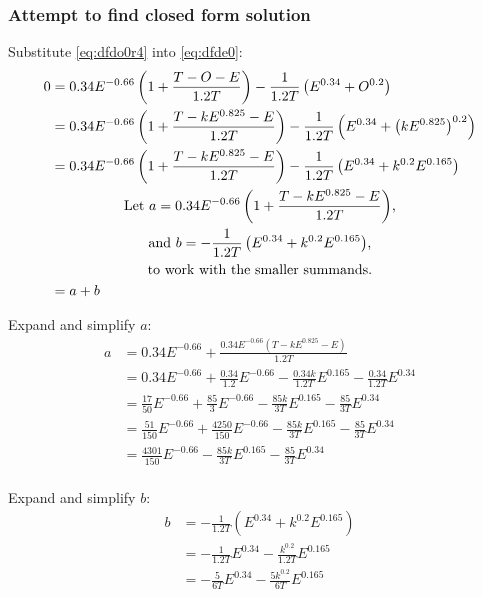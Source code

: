 \documentclass{article}
\begin{document}
\subsubsection{Attempt to find closed form solution}

Substitute \eqref{eq:dfdo0r4} into \eqref{eq:dfde0}:
\begin{equation}\label{eq:dfde0r}
  \begin{split}
    0 & = 0.34E^{-0.66}\left(1 + \frac{T - O - E}{1.2T}\right) - \frac{1}{1.2T}\left(E^{0.34} + O^{0.2}\right) \\
      & = 0.34E^{-0.66}\left(1 + \frac{T - kE^{0.825} - E}{1.2T}\right) - \frac{1}{1.2T}\left(E^{0.34} + \left(kE^{0.825}\right)^{0.2}\right) \\
      & = 0.34E^{-0.66}\left(1 + \frac{T - kE^{0.825} - E}{1.2T}\right) - \frac{1}{1.2T}\left(E^{0.34} + k^{0.2}E^{0.165}\right) \\
      \span \text{Let $a = 0.34E^{-0.66}\left(1 + \frac{T - kE^{0.825} - E}{1.2T}\right)$,} \\
      \span \text{and $b=- \frac{1}{1.2T}\left(E^{0.34} + k^{0.2}E^{0.165}\right)$,} \\
      \span \text{to work with the smaller summands.} \\
      & = a + b \\
  \end{split}
\end{equation}

Expand and simplify $a$:
\begin{equation}\label{eq:simpa}
  \begin{split}
  a & = 0.34E^{-0.66} + \frac{0.34E^{-0.66}\left(T - kE^{0.825} - E\right)}{1.2T} \\
    & = 0.34E^{-0.66} + \frac{0.34}{1.2}E^{-0.66} - \frac{0.34k}{1.2T}E^{0.165} - \frac{0.34}{1.2T}E^{0.34} \\
    & = \frac{17}{50}E^{-0.66} + \frac{85}{3}E^{-0.66} - \frac{85k}{3T}E^{0.165} - \frac{85}{3T}E^{0.34} \\
    & = \frac{51}{150}E^{-0.66} + \frac{4250}{150}E^{-0.66} - \frac{85k}{3T}E^{0.165} - \frac{85}{3T}E^{0.34} \\
    & = \frac{4301}{150}E^{-0.66} - \frac{85k}{3T}E^{0.165} - \frac{85}{3T}E^{0.34} \\
  \end{split}
\end{equation}

Expand and simplify $b$:
\begin{equation}\label{eq:simpb}
  \begin{split}
  b & = - \frac{1}{1.2T}\left(E^{0.34} + k^{0.2}E^{0.165}\right) \\
    & = - \frac{1}{1.2T}E^{0.34} - \frac{k^{0.2}}{1.2T}E^{0.165} \\
    & = - \frac{5}{6T}E^{0.34} - \frac{5k^{0.2}}{6T}E^{0.165} \\
  \end{split}
\end{equation}
\end{document}
